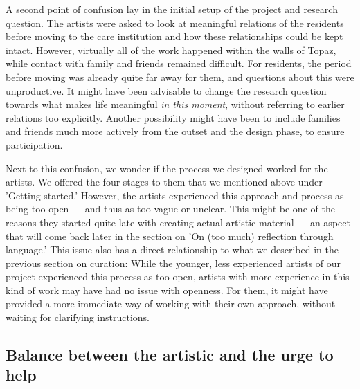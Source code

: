 \documentclass[authordate, empirical]{jote-new-article}
\begin{document}
	A second point of confusion lay in the initial setup of the project and research question. The artists were asked to look at meaningful relations of the residents before moving to the care institution and how these relationships could be kept intact. However, virtually all of the work happened within the walls of Topaz, while contact with family and friends remained difficult. For residents, the period before moving was already quite far away for them, and questions about this were unproductive. It might have been advisable to change the research question towards what makes life meaningful \emph{in this moment}, without referring to earlier relations too explicitly. Another possibility might have been to include families and friends much more actively from the outset and the design phase, to ensure participation.







	Next to this confusion, we wonder if the process we designed worked for the artists. We offered the four stages to them that we mentioned above under 'Getting started.' However, the artists experienced this approach and process as being too open --- and thus as too vague or unclear. This might be one of the reasons they started quite late with creating actual artistic material --- an aspect that will come back later in the section on 'On (too much) reflection through language.' This issue also has a direct relationship to what we described in the previous section on curation: While the younger, less experienced artists of our project experienced this process as too open, artists with more experience in this kind of work may have had no issue with openness. For them, it might have provided a more immediate way of working with their own approach, without waiting for clarifying instructions.







	\subsection{Balance between the artistic and the urge to help}
\end{document}
